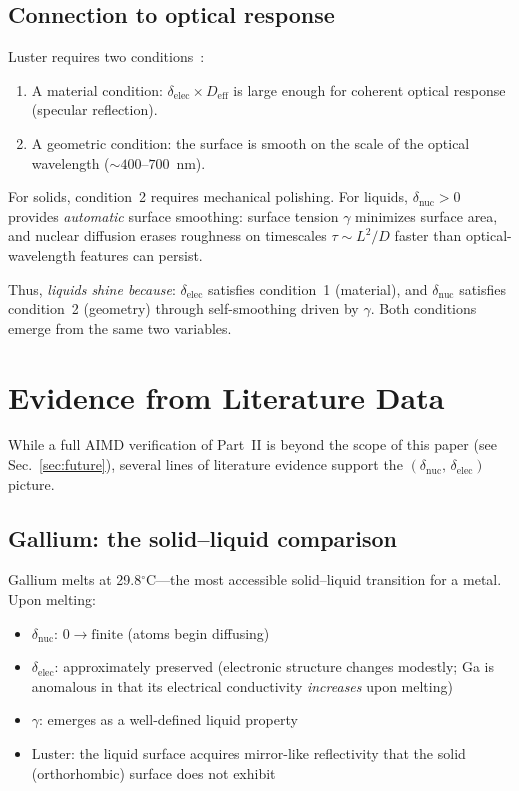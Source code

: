 \documentclass[twocolumn,showpacs,preprintnumbers,amsmath,amssymb,prb]{revtex4-2}
\begin{document}
\subsection{Connection to optical response}

Luster requires two conditions~\cite{SentoOpticsPaper1}:
\begin{enumerate}
  \item A material condition:
    $\delta_\mathrm{elec} \times D_\mathrm{eff}$ is large
    enough for coherent optical response (specular reflection).
  \item A geometric condition:
    the surface is smooth on the scale of the optical
    wavelength ($\sim\!400$--$700$~nm).
\end{enumerate}

For solids, condition~2 requires mechanical polishing.
For liquids, $\delta_\mathrm{nuc} > 0$ provides
\emph{automatic} surface smoothing: surface tension
$\gamma$ minimizes surface area, and nuclear diffusion
erases roughness on timescales $\tau \sim L^2/D$
faster than optical-wavelength features can persist.

Thus, \emph{liquids shine because}:
$\delta_\mathrm{elec}$ satisfies condition~1 (material),
and $\delta_\mathrm{nuc}$ satisfies condition~2 (geometry)
through self-smoothing driven by $\gamma$.
Both conditions emerge from the same two variables.


\section{Evidence from Literature Data}
\label{sec:evidence}

While a full AIMD verification of Part~II is beyond
the scope of this paper (see Sec.~\ref{sec:future}),
several lines of literature evidence support the
$(\delta_\mathrm{nuc},\,\delta_\mathrm{elec})$ picture.

\subsection{Gallium: the solid--liquid comparison}

Gallium melts at 29.8$^\circ$C---the most accessible
solid--liquid transition for a metal.
Upon melting:
\begin{itemize}
  \item $\delta_\mathrm{nuc}$: $0 \to \mathrm{finite}$
    (atoms begin diffusing)
  \item $\delta_\mathrm{elec}$: approximately preserved
    (electronic structure changes modestly;
    Ga is anomalous in that its electrical conductivity
    \emph{increases} upon melting)
  \item $\gamma$: emerges as a well-defined liquid property
  \item Luster: the liquid surface acquires mirror-like
    reflectivity that the solid (orthorhombic) surface
    does not exhibit
\end{itemize}
\end{document}
